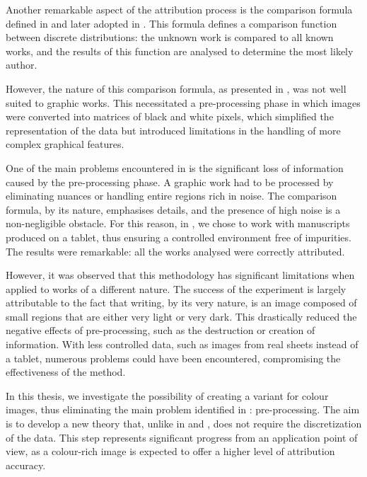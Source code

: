 \begin{toReview}
		\noindent Another remarkable aspect of the attribution process is the comparison formula defined in \cite{SapAttribution} and later adopted in \cite{thesis}. This formula defines a comparison function between discrete distributions: the unknown work is compared to all known works, and the results of this function are analysed to determine the most likely author.

		\noindent However, the nature of this comparison formula, as presented in \cite{SapAttribution}, was not well suited to graphic works. This necessitated a pre-processing phase in which images were converted into matrices of black and white pixels, which simplified the representation of the data but introduced limitations in the handling of more complex graphical features.

		\bigskip \noindent One of the main problems encountered in \cite{thesis} is the significant loss of information caused by the pre-processing phase. A graphic work had to be processed by eliminating nuances or handling entire regions rich in noise. The comparison formula, by its nature, emphasises details, and the presence of high noise is a non-negligible obstacle. For this reason, in \cite{thesis}, we chose to work with manuscripts produced on a tablet, thus ensuring a controlled environment free of impurities. The results were remarkable: all the works analysed were correctly attributed.

		\noindent However, it was observed that this methodology has significant limitations when applied to works of a different nature. The success of the experiment is largely attributable to the fact that writing, by its very nature, is an image composed of small regions that are either very light or very dark. This drastically reduced the negative effects of pre-processing, such as the destruction or creation of information. With less controlled data, such as images from real sheets instead of a tablet, numerous problems could have been encountered, compromising the effectiveness of the method.

		\bigskip \noindent In this thesis, we investigate the possibility of creating a variant for colour images, thus eliminating the main problem identified in \cite{thesis}: pre-processing. The aim is to develop a new theory that, unlike in \cite{thesis} and \cite{SapAttribution}, does not require the discretization of the data. This step represents significant progress from an application point of view, as a colour-rich image is expected to offer a higher level of attribution accuracy.


\end{toReview}
